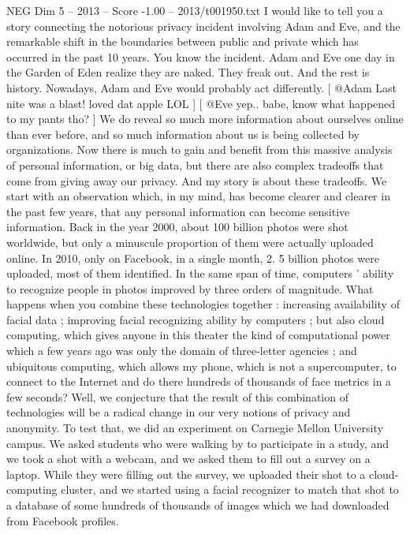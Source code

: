 \begin{textsample}{NEG Dim 5 – 2013 – Score -1.00 – 2013/t001950.txt}  \label{ex:f5_neg_040}
I would like to tell you a story connecting the notorious privacy incident involving Adam and Eve, and the remarkable shift in the boundaries between public and private which has occurred in the past 10 years.
You know the incident.
Adam and Eve one day in the Garden of Eden realize they are naked.
They freak out.
And the rest is history.
Nowadays, Adam and Eve would probably act differently. [ @Adam Last nite was a blast! loved dat apple LOL ] [ @Eve yep.. babe, know what happened to my pants tho? ] We do reveal so much more information about ourselves online than ever before, and so much information about us is being collected by organizations.
Now there is much to gain and benefit from this massive analysis of personal information, or big data, but there are also complex tradeoffs that come from giving away our privacy.
And my story is about these tradeoffs.
We start with an observation which, in my mind, has become clearer and clearer in the past few years, that any personal information can become sensitive information.
Back in the year 2000, about 100 billion photos were shot worldwide, but only a minuscule proportion of them were actually uploaded online.
In 2010, only on Facebook, in a single month, 2. 5 billion photos were uploaded, most of them identified.
In the same span of time, computers ' ability to recognize people in photos improved by three orders of magnitude.
What happens when you combine these technologies together : increasing availability of facial data ; improving facial recognizing ability by computers ; but also cloud computing, which gives anyone in this theater the kind of computational power which a few years ago was only the domain of three-letter agencies ; and ubiquitous computing, which allows my phone, which is not a supercomputer, to connect to the Internet and do there hundreds of thousands of face metrics in a few seconds?
Well, we conjecture that the result of this combination of technologies will be a radical change in our very notions of privacy and anonymity.
To test that, we did an experiment on Carnegie Mellon University campus.
We asked students who were walking by to participate in a study, and we took a shot with a webcam, and we asked them to fill out a survey on a laptop.
While they were filling out the survey, we uploaded their shot to a cloud-computing cluster, and we started using a facial recognizer to match that shot to a database of some hundreds of thousands of images which we had downloaded from Facebook profiles.

\end{textsample}
